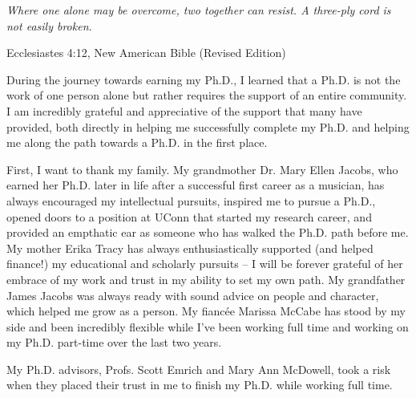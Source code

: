 \begin{acknowledge}
  \epigraph{\textit{Where one alone may be overcome, two together can resist. A three-ply cord is not easily broken.}}{Ecclesiastes 4:12, New American Bible (Revised Edition)}

  During the journey towards earning my Ph.D., I learned that a Ph.D. is not the work of one person alone but rather requires the support of an entire community. I am incredibly grateful and appreciative of the support that many have provided, both directly in helping me successfully complete my Ph.D. and helping me along the path towards a Ph.D. in the first place.

  First, I want to thank my family.  My grandmother Dr. Mary Ellen Jacobs, who earned her Ph.D. later in life after a successful first career as a musician, has always encouraged my intellectual pursuits, inspired me to pursue a Ph.D., opened doors to a position at UConn that started my research career, and provided an empthatic ear as someone who has walked the Ph.D. path before me.  My mother Erika Tracy has always enthusiastically supported (and helped finance!) my educational and scholarly pursuits -- I will be forever grateful of her embrace of my work and trust in my ability to set my own path. My grandfather James Jacobs was always ready with sound advice on people and character, which helped me grow as a person.  My fianc\'{e}e Marissa McCabe has stood by my side and been incredibly flexible while I've been working full time and working on my Ph.D. part-time over the last two years.
  
  My Ph.D. advisors, Profs. Scott Emrich and Mary Ann McDowell, took a risk when they placed their trust in me to finish my Ph.D. while working full time.

  
\end{acknowledge}
